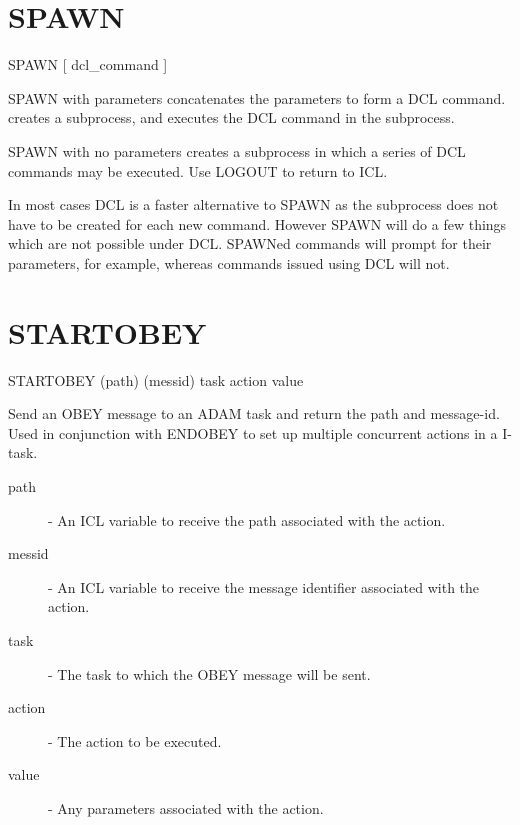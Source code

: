 \section{SPAWN}

    SPAWN \hspace{.5cm}  [ dcl\_command ]

 SPAWN with parameters concatenates the parameters to form a DCL command.
 creates a subprocess, and executes the DCL command in the subprocess.

 SPAWN with no parameters creates a subprocess in which a series of DCL
 commands may be executed. Use LOGOUT to return to ICL.

 In most cases DCL is a faster alternative to SPAWN as the subprocess does
 not have to be created for each new command. However SPAWN will do a few
 things which are not possible under DCL. SPAWNed commands will prompt for
 their parameters, for example, whereas commands issued using DCL will not.


\section{STARTOBEY}

   STARTOBEY \hspace{.5cm} (path) \hspace{.5cm} (messid) \hspace{.5cm} task 
\hspace{.5cm} action \hspace{.5cm} value

 Send an OBEY message to an ADAM task and return the path and message-id.
 Used in conjunction with ENDOBEY to set up multiple concurrent actions in
 a I-task.

\begin{description}

\item[path] - An ICL variable to receive the path associated with the action.

\item[messid] - An ICL variable to receive the message identifier associated 
               with the action.

\item[task] - The task to which the OBEY message will be sent.

\item[action] - The action to be executed.

\item[value] - Any parameters associated with the action.

\end{description}

